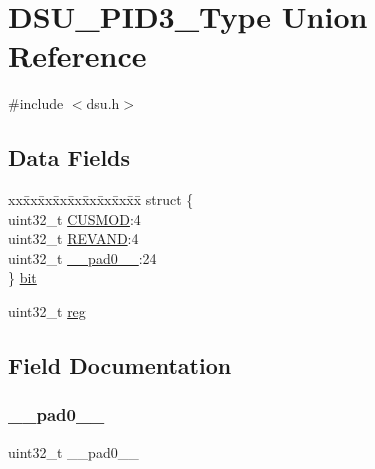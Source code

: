 \hypertarget{union_d_s_u___p_i_d3___type}{}\section{D\+S\+U\+\_\+\+P\+I\+D3\+\_\+\+Type Union Reference}
\label{union_d_s_u___p_i_d3___type}


{\ttfamily \#include $<$dsu.\+h$>$}

\subsection*{Data Fields}
\begin{DoxyCompactItemize}
\item 
\begin{tabbing}
xx\=xx\=xx\=xx\=xx\=xx\=xx\=xx\=xx\=\kill
struct \{\\
\>uint32\_t \mbox{\hyperlink{union_d_s_u___p_i_d3___type_abce93aebb35f28215ed71f8d5015e9e6}{CUSMOD}}:4\\
\>uint32\_t \mbox{\hyperlink{union_d_s_u___p_i_d3___type_ae57a0251504759538f043ef033cfc143}{REVAND}}:4\\
\>uint32\_t \mbox{\hyperlink{union_d_s_u___p_i_d3___type_a3e57c2ef1c3ffb36722f000cc1156824}{\_\_pad0\_\_}}:24\\
\} \mbox{\hyperlink{union_d_s_u___p_i_d3___type_a2b19a0fa7a3835eb615494c4b2b0255d}{bit}}\\

\end{tabbing}\item 
uint32\+\_\+t \mbox{\hyperlink{union_d_s_u___p_i_d3___type_a6b91636401516a477989a336376d7b40}{reg}}
\end{DoxyCompactItemize}


\subsection{Field Documentation}
\mbox{\label{union_d_s_u___p_i_d3___type_a3e57c2ef1c3ffb36722f000cc1156824}} 
\subsubsection{\texorpdfstring{\_\_pad0\_\_}{\_\_pad0\_\_}}
{\footnotesize\ttfamily uint32\+\_\+t \+\_\+\+\_\+pad0\+\_\+\+\_\+}

